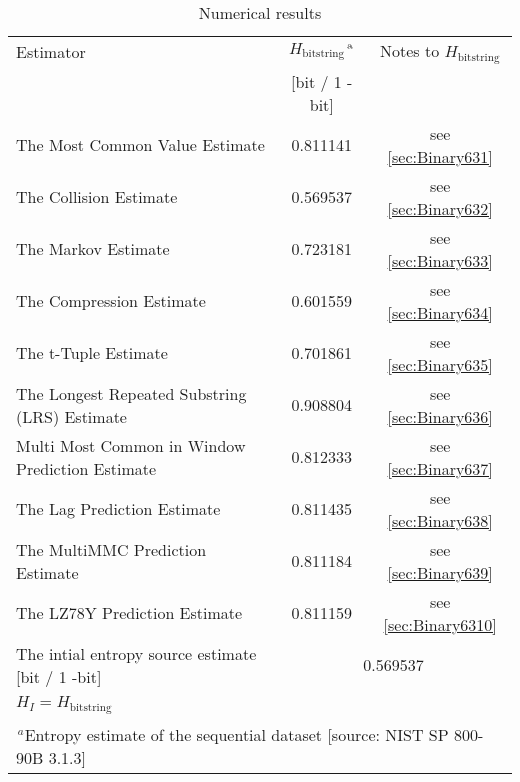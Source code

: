 \documentclass[a3paper,xelatex,english]{bxjsarticle}
\begin{document}
\begin{table}[h]
\caption{Numerical results}
\begin{center}
\begin{tabular}{|l|c|c|}
\hline 
\rowcolor{anotherlightblue} %
Estimator										& $H_{\textrm{bitstring}}$$^{\textrm{\,a}}$ & Notes to $H_{\textrm{bitstring}}$	\\ 
\cline{2-3}
\rowcolor{anotherlightblue} %
\,												& [bit / 1 - bit] & \,		\\
\hline 
The Most Common Value Estimate					& 0.811141& see \ref{sec:Binary631} \\
\hline 
The Collision Estimate							& 0.569537& see \ref{sec:Binary632} \\
\hline 
The Markov Estimate								& 0.723181& see \ref{sec:Binary633} \\
\hline 
The Compression Estimate						& 0.601559& see \ref{sec:Binary634} \\
\hline 
The t-Tuple Estimate							& 0.701861& see \ref{sec:Binary635} \\
\hline 
The Longest Repeated Substring (LRS) Estimate	& 0.908804& see \ref{sec:Binary636} \\
\hline 
Multi Most Common in Window Prediction Estimate	& 0.812333& see \ref{sec:Binary637} \\
\hline 
The Lag Prediction Estimate						& 0.811435& see \ref{sec:Binary638} \\
\hline 
The MultiMMC Prediction Estimate				& 0.811184& see \ref{sec:Binary639} \\
\hline 
The LZ78Y Prediction Estimate					& 0.811159& see \ref{sec:Binary6310} \\
\hline \hline 
The intial entropy source estimate [bit / 1 -bit]	& \multicolumn{2}{|c|}{0.569537}	\\
$H_{I} = H_{\textrm{bitstring}}$ & \multicolumn{2}{|c|}{ \, } 	\\
\hline \hline 
\multicolumn{3}{|l|}{$^{\,a}$\quad Entropy estimate of the sequential dataset [source: NIST SP 800-90B \cite{SP80090B} 3.1.3]} \\
\hline 
\end{tabular}
\end{center}
\end{table}
\end{document}
